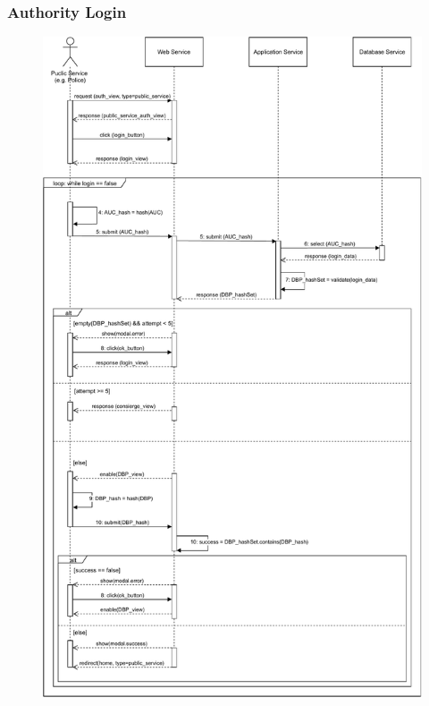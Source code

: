 \documentclass[12pt,a4paper]{article}
\begin{document}
\subsubsection{Authority Login}
\begin{figure}[H]
				\centering
				\includegraphics[width=1\textwidth,height=0.9\textheight,keepaspectratio]{../assets/sequence_diagrams/exports/login_public_subject.pdf}
				\label{fig:loginAuth_sequence}
			\end{figure}
\end{document}

